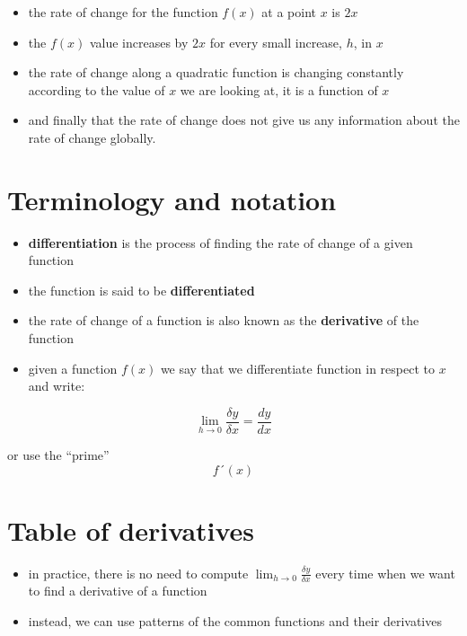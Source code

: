 \documentclass[
]{book}
\providecommand{\tightlist}{%
  \setlength{\itemsep}{0pt}\setlength{\parskip}{0pt}}
\theoremstyle{definition}
\theoremstyle{definition}
\theoremstyle{definition}
\theoremstyle{remark}
\begin{document}
\begin{itemize}
\tightlist
\item
  the rate of change for the function \(f(x)\) at a point \(x\) is \(2x\)
\item
  the \(f(x)\) value increases by \(2x\) for every small increase, \(h\), in \(x\)
\item
  the rate of change along a quadratic function is changing constantly according to the value of \(x\) we are looking at, it is a function of \(x\)
\item
  and finally that the rate of change does not give us any information about the rate of change globally.
\end{itemize}

\hypertarget{terminology-and-notation}{%
\section{Terminology and notation}\label{terminology-and-notation}}

\begin{itemize}
\tightlist
\item
  \textbf{differentiation} is the process of finding the rate of change of a given function
\item
  the function is said to be \textbf{differentiated}
\item
  the rate of change of a function is also known as the \textbf{derivative} of the function
\item
  given a function \(f(x)\) we say that we differentiate function in respect to \(x\) and write:
\end{itemize}

\[\lim_{h\to0}\frac{\delta y}{\delta x}= \frac{dy}{dx}\]

or use the ``prime'' \[f´(x)\]

\hypertarget{table-of-derivatives}{%
\section{Table of derivatives}\label{table-of-derivatives}}

\begin{itemize}
\tightlist
\item
  in practice, there is no need to compute \(\displaystyle \lim_{h\to0}\frac{\delta y}{\delta x}\) every time when we want to find a derivative of a function
\item
  instead, we can use patterns of the common functions and their derivatives
\end{itemize}
\end{document}
